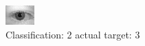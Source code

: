 \begin{figure}[h!]
\begin{center}
\includegraphics[width=0.60\columnwidth]{figures/ID592_class_2_target_3.png}
\end{center}
\caption{ Classification: 2 actual target: 3}
\label{fig:ID592_class_2_target_3}
\end{figure}
